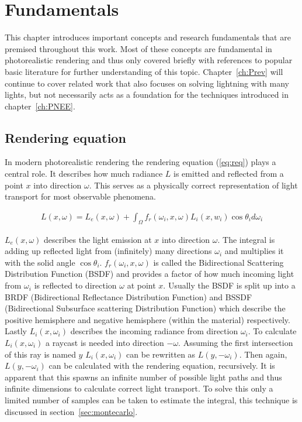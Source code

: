 \chapter{Fundamentals}
\label{ch:Fundamentals}
This chapter introduces important concepts and research fundamentals that are premised throughout this work. Most of these concepts are fundamental in photorealistic rendering and thus only covered briefly with references to popular basic literature for further understanding of this topic. Chapter~\ref{ch:Prev} will continue to cover related work that also focuses on solving lightning with many lights, but not necessarily acts as a foundation for the techniques introduced in chapter~\ref{ch:PNEE}.


\section{Rendering equation}

In modern photorealistic rendering the rendering equation (\ref{eq:req}) plays a central role. It describes how much radiance $L$ is emitted and reflected from a point $x$ into direction $\omega$. This serves as a physically correct representation of light transport for most observable phenomena.

\begin{align}
\label{eq:req}
L(x, \omega) =  L_e(x, \omega) + \int_{\Omega}f_r(\omega_i, x, \omega) L_i(x, w_i)\cos\theta_i d\omega_i 
\end{align}

$L_e(x, \omega)$ describes the light emission at $x$ into direction $\omega$. The integral is adding up reflected light from (infinitely) many directions $\omega_i$ and multiplies it with the solid angle $\cos \theta_i$. $f_r(\omega_i, x, \omega)$ is called the Bidirectional Scattering Distribution Function (BSDF) and provides a factor of how much incoming light from $\omega_i$ is reflected to direction $\omega$ at point $x$. Usually the BSDF is split up into a BRDF (Bidirectional Reflectance Distribution Function) and BSSDF (Bidirectional Subsurface scattering Distribution Function) which describe the positive hemisphere and negative hemisphere (within the material) respectively. Lastly $L_i(x, \omega_i)$ describes the incoming radiance from direction $\omega_i$. To calculate $L_i(x, \omega_i)$ a raycast is needed into direction $-\omega$. Assuming the first intersection of this ray is named $y$ $L_i(x, \omega_i)$ can be rewritten as $L(y, -\omega_i)$. Then again, $L(y, -\omega_i)$ can be calculated with the rendering equation, recursively. It is apparent that this spawns an infinite number of possible light paths and thus infinite dimensions to calculate correct light transport. To solve this only a limited number of samples can be taken to estimate the integral, this technique is discussed in section~\ref{sec:montecarlo}.

